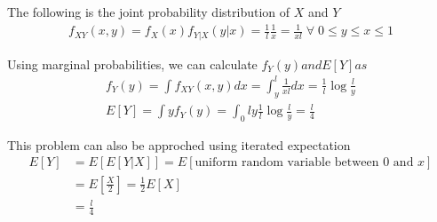 \documentclass[../../probability-notes.tex]{subfile}
\begin{document}
        The following is the joint probability distribution of $X$ and $Y$
        \begin{align*}
            f_{XY}(x, y) = f_{X}(x) f_{Y|X}(y|x) = \frac{1}{l} \frac{1}{x} = \frac{1}{xl} \;\forall\; 0 \leq y \leq x \leq 1
        \end{align*}
        
        Using marginal probabilities, we can calculate $f_{Y}(y) and E[Y] as$
        \begin{align*}
            f_{Y}(y) = \int f_{XY}(x,y) dx = \int_{y}^{l} \frac{1}{xl} dx = \frac{1}{l} \log \frac{l}{y} \tag*{Note that for any $y$, $y \leq x \leq l$}\\
            E[Y] = \int y f_{Y}(y) = \int_{0}{l} y \frac{1}{l} \log\frac{l}{y} = \frac{l}{4}
        \end{align*}

        This problem can also be approched using iterated expectation
        \begin{align*}
            E[Y] &= E[E[Y|X]] = E[\text{uniform random variable between $0$ and $x$}]\\
                &= E[\frac{X}{2}] =\frac{1}{2}E[X]\\
                &= \frac{l}{4} 
        \end{align*}
\end{document}
